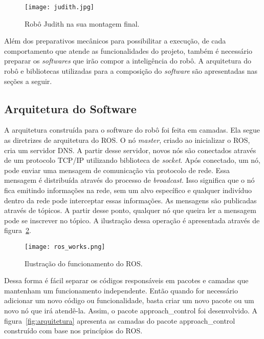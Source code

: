 \begin{figure}[ht!]
	\centering
	\begin{minipage}{0.4\textwidth}
		\caption{Robô Judith na sua montagem final.}
		\texttt{[image: judith.jpg]}
		\label{fig:newjudith}
	\end{minipage}
\end{figure}

Além dos preparativos mecânicos para possibilitar a execução, de cada comportamento que atende as funcionalidades do projeto, também é necessário preparar os \emph{softwares} que irão compor a inteligência do robô. A arquitetura do robô e bibliotecas utilizadas para a composição do \emph{software} são apresentadas nas seções a seguir.

\subsection{Arquitetura do Software} %
\label{sec:arquitetura}
A arquitetura construída para o software do robô foi feita em camadas. Ela segue as diretrizes de arquitetura do ROS. O nó \textit{master}, criado ao inicializar o ROS, cria um servidor DNS. A partir desse servidor, novos nós são conectados através de um protocolo TCP/IP utilizando biblioteca de \textit{socket}. Após conectado, um nó, pode enviar uma mensagem de comunicação via protocolo de rede. Essa mensagem é distribuída através do processo de \textit{broadcast}. Isso significa que o nó fica emitindo informações na rede, sem um alvo específico e qualquer indivíduo dentro da rede pode interceptar essas informações. As mensagens são publicadas através de tópicos. A partir desse ponto, qualquer nó que queira ler a mensagem pode se inscrever no tópico. A ilustração dessa operação é apresentada através de figura~\ref{fig:ros_works}.

\begin{figure}[ht!]
	\centering
	\begin{minipage}{0.6\textwidth}
		\caption{Ilustração do funcionamento do ROS.}
		\texttt{[image: ros\_works.png]}
		\label{fig:ros_works}
	\end{minipage}
\end{figure}

Dessa forma é fácil separar os códigos responsáveis em pacotes e camadas que mantenham um funcionamento independente. Então quando for necessário adicionar um novo código ou funcionalidade, basta criar um novo pacote ou um novo nó que irá atendê-la. Assim, o pacote approach\_control foi desenvolvido. A figura~\ref{fig:arquitetura} apresenta as camadas do pacote approach\_control construído com base nos princípios do ROS.

